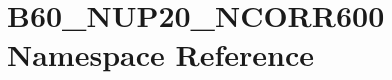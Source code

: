 \hypertarget{namespace_b60___n_u_p20___n_c_o_r_r600}{}\section{B60\+\_\+\+N\+U\+P20\+\_\+\+N\+C\+O\+R\+R600 Namespace Reference}
\label{namespace_b60___n_u_p20___n_c_o_r_r600}
